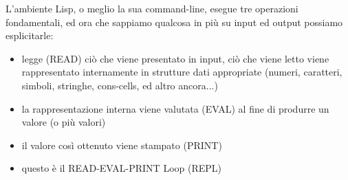 \documentclass[a4paper,12pt, oneside]{book}
\begin{document}
L'ambiente Lisp, o meglio la sua command-line, esegue tre operazioni fondamentali, ed ora che sappiamo qualcosa in più su input ed output possiamo esplicitarle:
\begin{itemize}
\item legge (READ) ciò che viene presentato in input, ciò che viene letto viene rappresentato internamente in strutture dati appropriate (numeri, caratteri, simboli, stringhe, cons-cells, ed altro ancora...) 
\item la rappresentazione interna viene valutata (EVAL) al fine di produrre un valore (o più valori)
\item il valore così ottenuto viene stampato (PRINT)
\item questo è il READ-EVAL-PRINT Loop (REPL)
\end{itemize}
\end{document}
